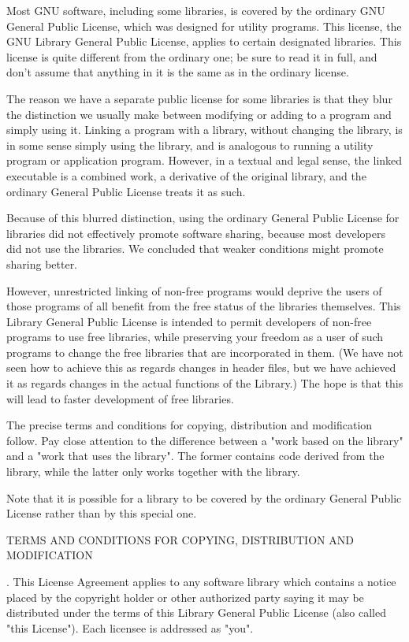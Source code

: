 Most GNU software, including some libraries, is covered by the ordinary GNU General Public License, which was designed for utility programs. This license, the GNU Library General Public License, applies to certain designated libraries. This license is quite different from the ordinary one; be sure to read it in full, and don't assume that anything in it is the same as in the ordinary license. 

The reason we have a separate public license for some libraries is that they blur the distinction we usually make between modifying or adding to a program and simply using it. Linking a program with a library, without changing the library, is in some sense simply using the library, and is analogous to running a utility program or application program. However, in a textual and legal sense, the linked executable is a combined work, a derivative of the original library, and the ordinary General Public License treats it as such. 

Because of this blurred distinction, using the ordinary General Public License for libraries did not effectively promote software sharing, because most developers did not use the libraries. We concluded that weaker conditions might promote sharing better. 

However, unrestricted linking of non-free programs would deprive the users of those programs of all benefit from the free status of the libraries themselves. This Library General Public License is intended to permit developers of non-free programs to use free libraries, while preserving your freedom as a user of such programs to change the free libraries that are incorporated in them. (We have not seen how to achieve this as regards changes in header files, but we have achieved it as regards changes in the actual functions of the Library.) The hope is that this will lead to faster development of free libraries. 

The precise terms and conditions for copying, distribution and modification follow. Pay close attention to the difference between a "work based on the library" and a "work that uses the library". The former contains code derived from the library, while the latter only works together with the library. 

Note that it is possible for a library to be covered by the ordinary General Public License rather than by this special one. 

\vparasmall
TERMS AND CONDITIONS FOR COPYING, DISTRIBUTION AND MODIFICATION

. This License Agreement applies to any software library which contains a notice placed by the copyright holder or other authorized party saying it may be distributed under the terms of this Library General Public License (also called "this License"). Each licensee is addressed as "you". 

